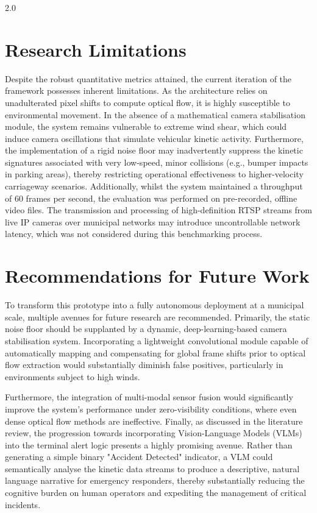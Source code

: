 \begin{spacing}{2.0}
\section{Research Limitations}
Despite the robust quantitative metrics attained, the current iteration of the framework possesses inherent limitations. As the architecture relies on unadulterated pixel shifts to compute optical flow, it is highly susceptible to environmental movement. In the absence of a mathematical camera stabilisation module, the system remains vulnerable to extreme wind shear, which could induce camera oscillations that simulate vehicular kinetic activity. Furthermore, the implementation of a rigid noise floor may inadvertently suppress the kinetic signatures associated with very low-speed, minor collisions (e.g., bumper impacts in parking areas), thereby restricting operational effectiveness to higher-velocity carriageway scenarios. Additionally, whilst the system maintained a throughput of 60 frames per second, the evaluation was performed on pre-recorded, offline video files. The transmission and processing of high-definition RTSP streams from live IP cameras over municipal networks may introduce uncontrollable network latency, which was not considered during this benchmarking process.
\section{Recommendations for Future Work}
To transform this prototype into a fully autonomous deployment at a municipal scale, multiple avenues for future research are recommended. Primarily, the static noise floor should be supplanted by a dynamic, deep-learning-based camera stabilisation system. Incorporating a lightweight convolutional module capable of automatically mapping and compensating for global frame shifts prior to optical flow extraction would substantially diminish false positives, particularly in environments subject to high winds.

Furthermore, the integration of multi-modal sensor fusion would significantly improve the system's performance under zero-visibility conditions, where even dense optical flow methods are ineffective. Finally, as discussed in the literature review, the progression towards incorporating Vision-Language Models (VLMs) into the terminal alert logic presents a highly promising avenue. Rather than generating a simple binary "Accident Detected" indicator, a VLM could semantically analyse the kinetic data streams to produce a descriptive, natural language narrative for emergency responders, thereby substantially reducing the cognitive burden on human operators and expediting the management of critical incidents.


\end{spacing}
